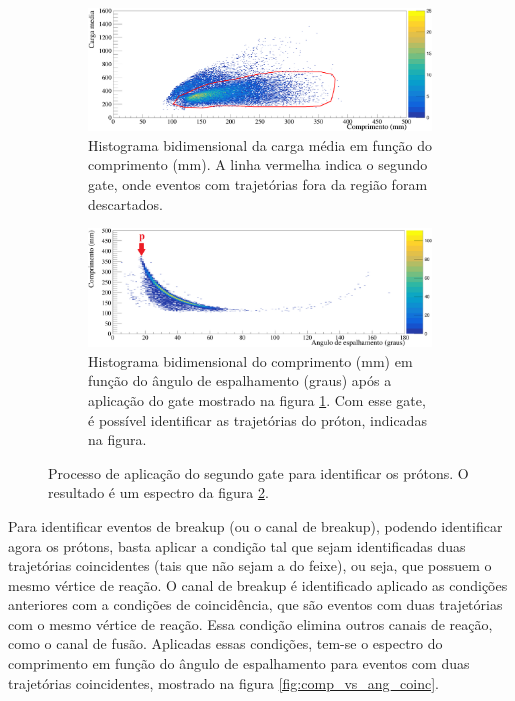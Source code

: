 \documentclass[a4paper,12pt,oneside]{book}
\begin{document}
\begin{figure}[H]
\centering
    \begin{subfigure}[b]{\textwidth}
        \centering
        \includegraphics[scale = 0.5, width=\columnwidth]{figs/carga_media_vs_comp_cut1.png}
        \caption{Histograma bidimensional da carga média em função do comprimento (mm). A linha vermelha indica o segundo gate, onde eventos com trajetórias fora da região foram descartados.}
        \label{subfig:gate2_antes}
    \end{subfigure}%
    \hfill
    \begin{subfigure}[b]{\textwidth}
        \centering
        \includegraphics[scale=0.5, width=\columnwidth]{figs/comp_vs_ang_n2_cut12.png}
        \caption{Histograma bidimensional do comprimento (mm) em função do ângulo de espalhamento (graus) após a aplicação do gate mostrado na figura \ref{subfig:gate2_antes}. Com esse gate, é possível identificar as trajetórias do próton, indicadas na figura.}
        \label{subfig:gate2_depois}
    \end{subfigure}%
	\hfill
\caption{Processo de aplicação do segundo gate para identificar os prótons. O resultado é um espectro da figura \ref{subfig:gate2_depois}.}
\label{fig:gate_2}
\end{figure}

\par Para identificar eventos de breakup (ou o canal de breakup), podendo identificar agora os prótons, basta aplicar a condição tal que sejam identificadas duas trajetórias coincidentes (tais que não sejam a do feixe), ou seja, que possuem o mesmo vértice de reação. O canal de breakup é identificado aplicado as condições anteriores com a condições de coincidência, que são eventos com duas trajetórias com o mesmo vértice de reação. Essa condição elimina outros canais de reação, como o canal de fusão. Aplicadas essas condições, tem-se o espectro do comprimento em função do ângulo de espalhamento para eventos com duas trajetórias coincidentes, mostrado na figura \ref{fig:comp_vs_ang_coinc}. 
\end{document}

